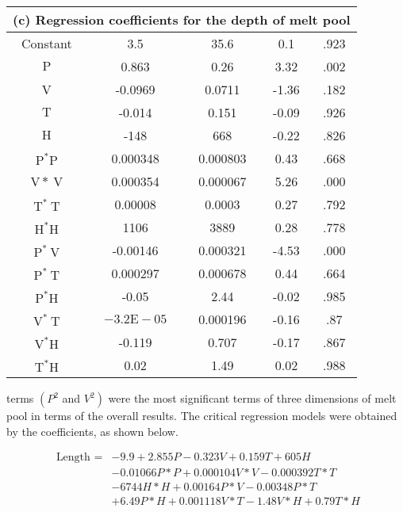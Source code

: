 \documentclass[10pt]{article}
\begin{document}
\begin{center}
\begin{tabular}{|c|c|c|c|c|}
\hline
\multicolumn{5}{|c|}{(c) Regression coefficients for the depth of melt pool} \\
\hline
Constant & 3.5 & 35.6 & 0.1 & .923 \\
\hline
$\mathrm{P}$ & 0.863 & 0.26 & 3.32 & .002 \\
\hline
V & -0.0969 & 0.0711 & -1.36 & .182 \\
\hline
$\mathrm{T}$ & -0.014 & 0.151 & -0.09 & .926 \\
\hline
$\mathrm{H}$ & -148 & 668 & -0.22 & .826 \\
\hline
$\mathrm{P}^{*} \mathrm{P}$ & 0.000348 & 0.000803 & 0.43 & .668 \\
\hline
$\mathrm{V} * \mathrm{~V}$ & 0.000354 & 0.000067 & 5.26 & .000 \\
\hline
$\mathrm{T}^{*} \mathrm{~T}$ & 0.00008 & 0.0003 & 0.27 & .792 \\
\hline
$\mathrm{H}^{*} \mathrm{H}$ & 1106 & 3889 & 0.28 & .778 \\
\hline
$\mathrm{P}^{*} \mathrm{~V}$ & -0.00146 & 0.000321 & -4.53 & .000 \\
\hline
$\mathrm{P}^{*} \mathrm{~T}$ & 0.000297 & 0.000678 & 0.44 & .664 \\
\hline
$\mathrm{P}^{*} \mathrm{H}$ & -0.05 & 2.44 & -0.02 & .985 \\
\hline
$\mathrm{V}^{*} \mathrm{~T}$ & $-3.2 \mathrm{E}-05$ & 0.000196 & -0.16 & .87 \\
\hline
$\mathrm{V}^{*} \mathrm{H}$ & -0.119 & 0.707 & -0.17 & .867 \\
\hline
$\mathrm{T}^{*} \mathrm{H}$ & 0.02 & 1.49 & 0.02 & .988 \\
\hline
\end{tabular}
\end{center}

terms $\left(P^{2}\right.$ and $\left.V^{2}\right)$ were the most significant terms of three dimensions of melt pool in terms of the overall results. The critical regression models were obtained by the coefficients, as shown below.


\begin{align*}
\text { Length }= & -9.9+2.855 P-0.323 V+0.159 T+605 H \\
& -0.01066 P * P+0.000104 V * V-0.000392 T * T \\
& -6744 H * H+0.00164 P * V-0.00348 P * T  \tag{20}\\
& +6.49 P * H+0.001118 V * T-1.48 V * H+0.79 T * H
\end{align*}
\end{document}
